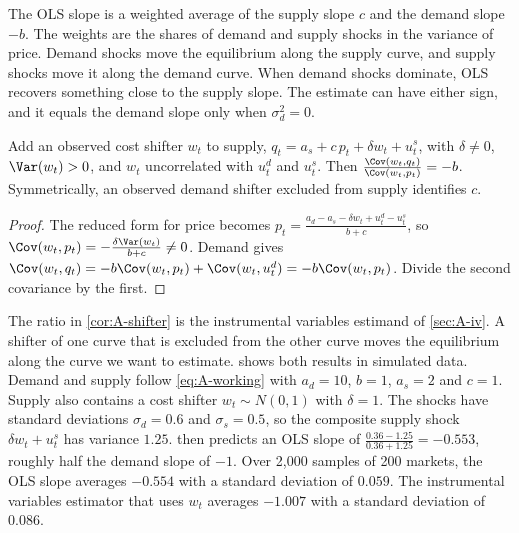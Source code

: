 The OLS slope is a weighted average of the supply slope $c$ and the demand slope $-b$. The weights are the
shares of demand and supply shocks in the variance of price. Demand shocks move the equilibrium along the
supply curve, and supply shocks move it along the demand curve. When demand shocks dominate, OLS recovers
something close to the supply slope. The estimate can have either sign, and it equals the demand slope only
when $\sigma_d^2 = 0$.

\begin{corollary}\label{cor:A-shifter}
Add an observed cost shifter $w_t$ to supply, $q_t = a_s + c\,p_t + \delta w_t + u^s_t$, with $\delta \neq 0$,
$\Var(w_t) > 0$, and $w_t$ uncorrelated with $u^d_t$ and $u^s_t$. Then
$\frac{\Cov(w_t, q_t)}{\Cov(w_t, p_t)} = -b$. Symmetrically, an observed demand shifter excluded from supply
identifies $c$.
\end{corollary}

\begin{proof}
The reduced form for price becomes $p_t = \frac{a_d - a_s - \delta w_t + u^d_t - u^s_t}{b + c}$, so
$\Cov(w_t, p_t) = -\frac{\delta\Var(w_t)}{b + c} \neq 0$. Demand gives
$\Cov(w_t, q_t) = -b\Cov(w_t, p_t) + \Cov(w_t, u^d_t) = -b\Cov(w_t, p_t)$. Divide the second covariance by
the first.
\end{proof}

The ratio in \cref{cor:A-shifter} is the instrumental variables estimand of \cref{sec:A-iv}. A shifter of one
curve that is excluded from the other curve moves the equilibrium along the curve we want to estimate.
 shows both results in simulated data. Demand and supply follow
\eqref{eq:A-working} with $a_d = 10$, $b = 1$, $a_s = 2$ and $c = 1$. Supply also contains a cost shifter
$w_t \sim N(0, 1)$ with $\delta = 1$. The shocks have standard deviations $\sigma_d = 0.6$ and $\sigma_s = 0.5$, so the
composite supply shock $\delta w_t + u^s_t$ has variance $1.25$.  then predicts
an OLS slope of $\frac{0.36 - 1.25}{0.36 + 1.25} = -0.553$, roughly half the demand slope of $-1$. Over 2,000
samples of 200 markets, the OLS slope averages $-0.554$ with a standard deviation of $0.059$. The instrumental
variables estimator that uses $w_t$ averages $-1.007$ with a standard deviation of $0.086$.

